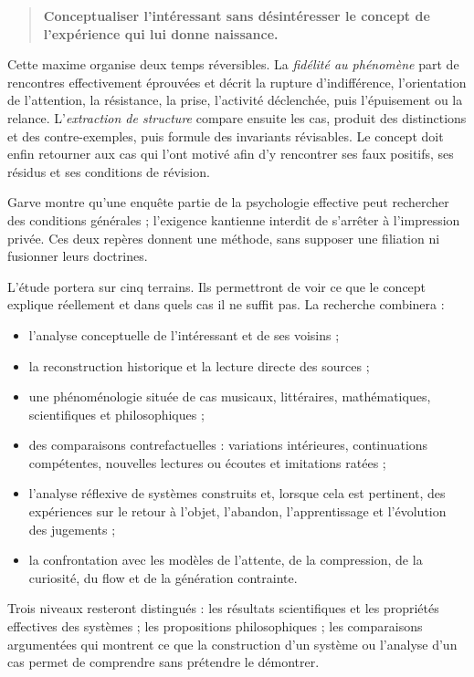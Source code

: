 \documentclass[11pt,a4paper]{article}
\begin{document}
\begin{quote}
\textbf{Conceptualiser l'intéressant sans désintéresser le concept de
l'expérience qui lui donne naissance.}
\end{quote}

Cette maxime organise deux temps réversibles. La \emph{fidélité au phénomène}
part de rencontres effectivement éprouvées et décrit la rupture d'indifférence,
l'orientation de l'attention, la résistance, la prise, l'activité déclenchée,
puis l'épuisement ou la relance. L'\emph{extraction de structure} compare ensuite
les cas, produit des distinctions et des contre-exemples, puis formule des
invariants révisables. Le concept doit enfin retourner aux cas qui l'ont motivé
afin d'y rencontrer ses faux positifs, ses résidus et ses conditions de révision.

Garve montre qu'une enquête partie de la psychologie effective peut rechercher
des conditions générales ; l'exigence kantienne interdit de s'arrêter à
l'impression privée. Ces deux repères donnent une méthode, sans supposer une
filiation ni fusionner leurs doctrines.

L'étude portera sur cinq terrains. Ils permettront de voir ce que le concept
explique réellement et dans quels cas il ne suffit pas. La recherche combinera :

\begin{itemize}
  \item l'analyse conceptuelle de l'intéressant et de ses voisins ;
  \item la reconstruction historique et la lecture directe des sources ;
  \item une phénoménologie située de cas musicaux, littéraires, mathématiques,
        scientifiques et philosophiques ;
  \item des comparaisons contrefactuelles : variations intérieures,
        continuations compétentes, nouvelles lectures ou écoutes et imitations ratées ;
  \item l'analyse réflexive de systèmes construits et, lorsque cela est
        pertinent, des expériences sur le retour à l'objet, l'abandon, l'apprentissage
        et l'évolution des jugements ;
  \item la confrontation avec les modèles de l'attente, de la compression, de
        la curiosité, du flow et de la génération contrainte.
\end{itemize}

Trois niveaux resteront distingués : les résultats scientifiques et les
propriétés effectives des systèmes ; les propositions philosophiques ; les
comparaisons argumentées qui montrent ce que la construction d'un système ou
l'analyse d'un cas permet de comprendre sans prétendre le démontrer.
\end{document}
